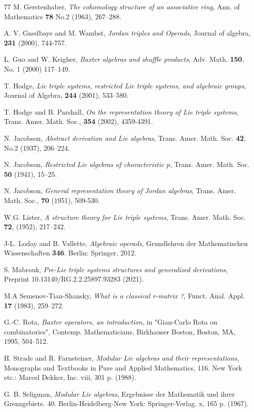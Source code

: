 \documentclass[11pt, twoside]{article}
\begin{document}
\begin{thebibliography}{77}
        M. Gerstenhaber,
        \emph{The cohomology structure of an associative ring}, Ann. of Mathematics {\bf 78}  No.2 (1963), 267--288.

        A. V. Gnedbaye and M. Wambst,
        \emph{Jordan triples and Operads}, Journal of algebra, {\bf 231} (2000), 744-757.

         L. Guo and W. Keigher, \emph{ Baxter algebras and shuffle products}, Adv. Math.
{\bf150},  No. 1 (2000) 117--149.

        T. Hodge,
        \emph{Lie triple systems, restricted Lie triple systems, and algebraic groups}, Journal of Algebra, {\bf 244} (2001), 533--580.

        T. Hodge and B. Parshall,
        \emph{On the representation theory of Lie triple systems},  Trans. Amer. Math. Soc., {\bf 354} (2002), 4359-4391.

        N. Jacobson,
        \emph{Abstract derivation and Lie algebras},
        Trans. Amer. Math. Soc. {\bf 42}, No.2 (1937), 206--224.

        N. Jacobson,
        \emph{Restricted Lie algebras of characteristic $p$},
        Trans. Amer. Math. Soc. {\bf 50} (1941), 15--25.

        N. Jacobson,
        \emph{General representation theory of Jordan algebras}, Trans. Amer. Math. Soc., {\bf 70} (1951), 509-530.

        W.G. Lister,
        \emph{A structure theory for Lie triple systems}, 
Trans. Amer. Math. Soc. {\bf 72}, (1952), 217--242.

        J-L. Loday and B. Vallette,
        \emph{Algebraic operads}, Grundlehren der Mathematischen Wissenschaften {\bf 346}. Berlin: Springer, 2012.

        S. Mabrouk,
        \emph{Pre-Lie triple systems structures and generalized derivations}, Preprint 10.13140/RG.2.2.25897.93283 (2021). 

        M.A Semenov-Tian-Shansky,
        \emph{What is a classical r-matrix ?}, Funct. Anal. Appl. {\bf 17} (1983), 259--272.

 G.-C. Rota, \emph{Baxter operators, an introduction}, in "Gian-Carlo
Rota on combinatorics", Contemp. Mathematicians, Birkhauser Boston,
Boston, MA, 1995, 504--512.

        H. Strade and R. Farnsteiner,
        \emph{Modular Lie algebras and their representations}, 
Monographs and Textbooks in Pure and Applied Mathematics, 116. New York etc.: Marcel Dekker, Inc. viii, 301 p. (1988).

        G. B. Seligman,
        \emph{Modular Lie algebras},
Ergebnisse der Mathematik und ihrer Grenzgebiete. 40. Berlin-Heidelberg-New York: Springer-Verlag. x, 165 p. (1967).


        
	\end{thebibliography}
\end{document}
